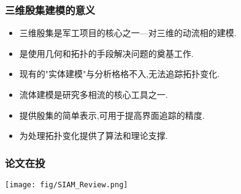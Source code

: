 \documentclass[UTF8]{ctexbeamer}	%
\theoremstyle{plain}
\theoremstyle{definition}
\theoremstyle{remark}
\numberwithin{equation}{section}
\begin{document}
\begin{frame}
    \frametitle{三维殷集建模的意义}
    \begin{itemize}
        \item 三维殷集是军工项目的核心之一---对三维的动流相的建模.
        \item 是使用几何和拓扑的手段解决问题的奠基工作.
        \item 现有的"实体建模"与分析格格不入,无法追踪拓扑变化.
        \item 流体建模是研究多相流的核心工具之一.
        \item 提供殷集的简单表示,可用于提高界面追踪的精度.
        \item 为处理拓扑变化提供了算法和理论支撑.
    \end{itemize}

\end{frame}

\begin{frame}
    \frametitle{论文在投}
    \texttt{[image: fig/SIAM\_Review.png]}
\end{frame}
\end{document}
